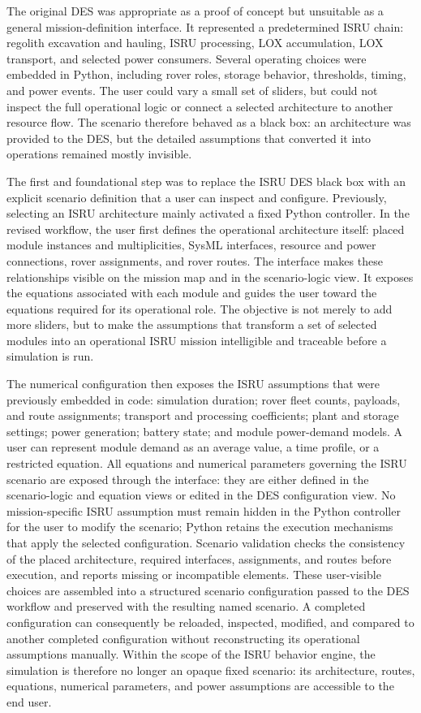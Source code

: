 The original DES was appropriate as a proof of concept but unsuitable as a general mission-definition interface. It represented a predetermined ISRU chain: regolith excavation and hauling, ISRU processing, LOX accumulation, LOX transport, and selected power consumers. Several operating choices were embedded in Python, including rover roles, storage behavior, thresholds, timing, and power events. The user could vary a small set of sliders, but could not inspect the full operational logic or connect a selected architecture to another resource flow. The scenario therefore behaved as a black box: an architecture was provided to the DES, but the detailed assumptions that converted it into operations remained mostly invisible.

The first and foundational step was to replace the ISRU DES black box with an explicit scenario definition that a user can inspect and configure. Previously, selecting an ISRU architecture mainly activated a fixed Python controller. In the revised workflow, the user first defines the operational architecture itself: placed module instances and multiplicities, SysML interfaces, resource and power connections, rover assignments, and rover routes. The interface makes these relationships visible on the mission map and in the scenario-logic view. It exposes the equations associated with each module and guides the user toward the equations required for its operational role. The objective is not merely to add more sliders, but to make the assumptions that transform a set of selected modules into an operational ISRU mission intelligible and traceable before a simulation is run.

The numerical configuration then exposes the ISRU assumptions that were previously embedded in code: simulation duration; rover fleet counts, payloads, and route assignments; transport and processing coefficients; plant and storage settings; power generation; battery state; and module power-demand models. A user can represent module demand as an average value, a time profile, or a restricted equation. All equations and numerical parameters governing the ISRU scenario are exposed through the interface: they are either defined in the scenario-logic and equation views or edited in the DES configuration view. No mission-specific ISRU assumption must remain hidden in the Python controller for the user to modify the scenario; Python retains the execution mechanisms that apply the selected configuration. Scenario validation checks the consistency of the placed architecture, required interfaces, assignments, and routes before execution, and reports missing or incompatible elements. These user-visible choices are assembled into a structured scenario configuration passed to the DES workflow and preserved with the resulting named scenario. A completed configuration can consequently be reloaded, inspected, modified, and compared to another completed configuration without reconstructing its operational assumptions manually. Within the scope of the ISRU behavior engine, the simulation is therefore no longer an opaque fixed scenario: its architecture, routes, equations, numerical parameters, and power assumptions are accessible to the end user.

